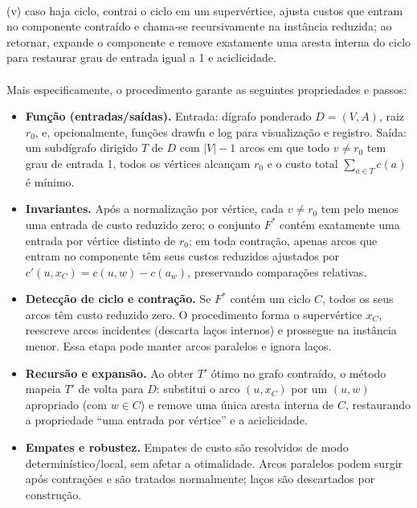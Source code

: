 \documentclass[12pt,a4paper]{article}
\def\texttt#1{#1}%
\def\emph#1{#1}%
\def\_{}%
\begin{document}
\paragraph{}
(v) caso haja ciclo, contrai o ciclo em um supervértice, ajusta custos que \emph{entram} no componente contraído e chama‑se recursivamente na instância reduzida; ao retornar, expande o componente e remove exatamente uma aresta interna do ciclo para restaurar grau de entrada igual a 1 e aciclicidade.

\paragraph{}
Mais especificamente, o procedimento garante as seguintes propriedades e passos:
\begin{itemize}\setlength{\itemsep}{2pt}
    \item \textbf{Função (entradas/saídas).} Entrada: dígrafo ponderado \(D=(V,A)\), raiz \(r_0\), e, opcionalmente, funções \texttt{draw\_fn} e \texttt{log} para visualização e registro. Saída: um subdígrafo dirigido \(T\) de \(D\) com \(|V|-1\) arcos em que todo \(v\neq r_0\) tem grau de entrada 1, todos os vértices alcançam \(r_0\) e o custo total \(\sum_{a\in T} c(a)\) é mínimo.
    \item \textbf{Invariantes.} Após a normalização por vértice, cada \(v\neq r_0\) tem pelo menos uma entrada de custo reduzido zero; o conjunto \(F^*\) contém exatamente uma entrada por vértice distinto de \(r_0\); em toda contração, apenas arcos que \emph{entram} no componente têm seus custos reduzidos ajustados por \(c'(u,x_C)=c(u,w)-c(a_w)\), preservando comparações relativas.
    \item \textbf{Detecção de ciclo e contração.} Se \(F^*\) contém um ciclo \(C\), todos os seus arcos têm custo reduzido zero. O procedimento forma o supervértice \(x_C\), reescreve arcos incidentes (descarta laços internos) e prossegue na instância menor. Essa etapa pode manter arcos paralelos e ignora laços.
    \item \textbf{Recursão e expansão.} Ao obter \(T'\) ótimo no grafo contraído, o método mapeia \(T'\) de volta para \(D\): substitui o arco \((u,x_C)\) por um \((u,w)\) apropriado (com \(w\in C\)) e remove uma única aresta interna de \(C\), restaurando a propriedade “uma entrada por vértice” e a aciclicidade.
    \item \textbf{Empates e robustez.} Empates de custo são resolvidos de modo determinístico/local, sem afetar a otimalidade. Arcos paralelos podem surgir após contrações e são tratados normalmente; laços são descartados por construção.

\end{itemize}
\end{document}
